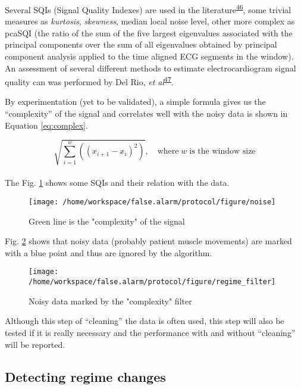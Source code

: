 \documentclass[12pt,twoside]{fmupthesis}
\begin{document}
Several SQIs (Signal Quality Indexes) are used in the literature\textsuperscript{\protect\hyperlink{ref-eerikainen2015}{46}}, some trivial
measures as \emph{kurtosis}, \emph{skewness}, median local noise level, other more complex as pcaSQI (the
ratio of the sum of the five largest eigenvalues associated with the principal components over the
sum of all eigenvalues obtained by principal component analysis applied to the time aligned ECG
segments in the window). An assessment of several different methods to estimate electrocardiogram
signal quality can was performed by Del Rio, \emph{et al}\textsuperscript{\protect\hyperlink{ref-DelRio2011}{47}}.

By experimentation (yet to be validated), a simple formula gives us the
``complexity'' of the signal and correlates well with the noisy data is shown in Equation
\eqref{eq:complex}.

\hfill\break
\begin{equation}
\sqrt{\sum_{i=1}^w((x_{i+1}-x_i)^2)}, \quad \text{where}\; w \; \text{is the window size} \label{eq:complex}
\end{equation}\\
The Fig. \ref{fig:sqi} shows some SQIs and their relation with the data.
\begin{figure}

{\centering \texttt{[image: /home/workspace/false.alarm/protocol/figure/noise]} 

}

\caption{Green line is the "complexity" of the signal}\label{fig:sqi}
\end{figure}
Fig. \ref{fig:datafilter} shows that noisy data (probably patient muscle movements) are marked
with a blue point and thus are ignored by the algorithm.
\begin{figure}

{\centering \texttt{[image: /home/workspace/false.alarm/protocol/figure/regime\_filter]} 

}

\caption{Noisy data marked by the "complexity" filter}\label{fig:datafilter}
\end{figure}
Although this step of ``cleaning'' the data is often used, this step will also be tested if it is
really necessary and the performance with and without ``cleaning'' will be reported.

\hypertarget{detecting-regime-changes}{%
\subsection{Detecting regime changes}\label{detecting-regime-changes}}
\end{document}
